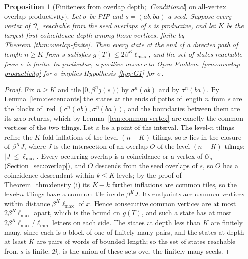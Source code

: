 \documentclass[11pt]{amsart}
\theoremstyle{plain}
\newtheorem{proposition}[theorem]{Proposition}
\theoremstyle{definition}
\theoremstyle{remark}
\newcommand{\B}{\mathcal{B}}
\newcommand{\red}{\operatorname{red}}
\newcommand{\Status}[1]{\textup{[\textit{#1}]}}
\begin{document}
\begin{proposition}[Finiteness from overlap depth; \Status{Conditional} on all-vertex overlap productivity]\label{prop:G1-from-overlaps}
Let $\sigma$ be PIP and $s=(ab,ba)$ a seed. Suppose every vertex of $\mathcal O_\sigma$ reachable from the seed overlaps of $s$ is productive, and let $K$ be the largest first-coincidence depth among those vertices, finite by Theorem~\ref{thm:overlap-finite}. Then every state at the end of a directed path of length $n\ge K$ from $s$ satisfies $g(T)\le2\beta^K\ell_{\max}$, and the set of states reachable from $s$ is finite. In particular, a positive answer to Open Problem~\ref{prob:overlap-productivity} for $\sigma$ implies Hypothesis~\ref{hyp:G1} for $\sigma$.
\end{proposition}
\begin{proof}
Fix $n\ge K$ and tile $[0,\beta^ng(s))$ by $\sigma^n(ab)$ and by $\sigma^n(ba)$. By Lemma~\ref{lem:descendants} the states at the ends of paths of length $n$ from $s$ are the blocks of $\red(\sigma^n(ab),\sigma^n(ba))$, and the boundaries between them are its zero returns, which by Lemma~\ref{lem:common-vertex} are exactly the common vertices of the two tilings. Let $x$ be a point of the interval. The level-$n$ tilings refine the $K$-fold inflations of the level-$(n-K)$ tilings, so $x$ lies in the closure of $\beta^KJ$, where $J$ is the intersection of an overlap $O$ of the level-$(n-K)$ tilings; $|J|\le\ell_{\max}$. Every occurring overlap is a coincidence or a vertex of $\mathcal O_\sigma$ (Section~\ref{sec:overlap}), and $O$ descends from the seed overlaps of $s$, so $O$ has a coincidence descendant within $k\le K$ levels; by the proof of Theorem~\ref{thm:density}(i) its $K-k$ further inflations are common tiles, so the level-$n$ tilings have a common tile inside $\beta^KJ$. Its endpoints are common vertices within distance $\beta^K\ell_{\max}$ of $x$. Hence consecutive common vertices are at most $2\beta^K\ell_{\max}$ apart, which is the bound on $g(T)$, and such a state has at most $2\beta^K\ell_{\max}/\ell_{\min}$ letters on each side. The states at depth less than $K$ are finitely many, since each is a block of one of finitely many pairs, and the states at depth at least $K$ are pairs of words of bounded length; so the set of states reachable from $s$ is finite. $\B_\sigma$ is the union of these sets over the finitely many seeds.
\end{proof}
\end{document}
